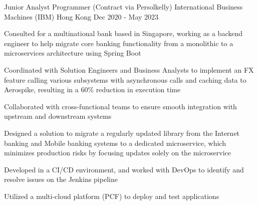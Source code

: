 \begin{cventries}
  \cventry
    {Junior Analyst Programmer (Contract via Persolkelly)}
    {International Business Machines (IBM)}
    {Hong Kong}
    {Dec 2020 - May 2023}
    {
        \begin{cvitems}
          \item {Consulted for a multinational bank based in Singapore, working as a backend engineer to help migrate core banking functionality from a monolithic to a microservices architecture using Spring Boot}
          \item {Coordinated with Solution Engineers and Business Analysts to implement an FX feature calling various subsystems with asynchronous calls and caching data to Aerospike, resulting in a 60\% reduction in execution time}
          \item {Collaborated with cross-functional teams to ensure smooth integration with upstream and downstream systems}
          \item {Designed a solution to migrate a regularly updated library from the Internet banking and Mobile banking systems to a dedicated microservice, which minimizes production risks by focusing updates solely on the microservice}
          \item {Developed in a CI/CD environment, and worked with DevOps to identify and resolve issues on the Jenkins pipeline}
          \item {Utilized a multi-cloud platform (PCF) to deploy and test applications}
        \end{cvitems}
    }
  

\end{cventries}
